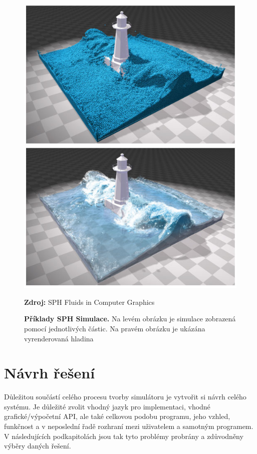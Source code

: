 \begin{figure}[h]\centering
	\centering
	\captionsetup{justification=centering}
	\includegraphics[width=0.5\linewidth]{obrazky-figures/SPHSim1_01.jpg}\hfill
	\includegraphics[width=0.5\linewidth]{obrazky-figures/SPHSim1_02.jpg}\hfill
	\caption{\textbf{Příklady SPH Simulace.} Na levém obrázku je simulace zobrazená pomocí jednotlivých částic. Na pravém obrázku je ukázána vyrenderovaná hladina}
	\textbf{Zdroj: } SPH Fluids in Computer Graphics \cite{Ihmsen14}
	\label{fig:SPHFigure}
\end{figure}

\chapter{Návrh řešení}
\label{chapter:navrh_resení}
Důležitou součástí celého procesu tvorby simulátoru je vytvořit si návrh celého systému. Je důležité zvolit vhodný jazyk pro implementaci, vhodné grafické/výpočetní API, ale také celkovou podobu programu, jeho vzhled, funkčnost a v neposlední řadě rozhraní mezi uživatelem a samotným programem. V následujících podkapitolách jsou tak tyto problémy probrány a zdůvodněny výběry daných řešení. 

